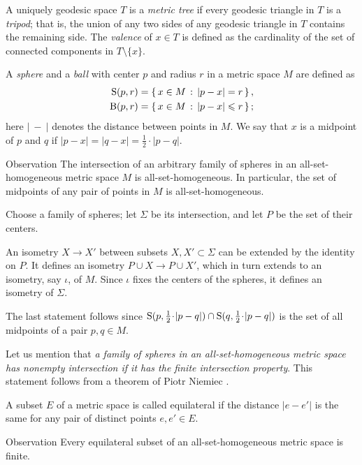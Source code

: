 \documentclass[leqno,a4paper,10pt]{article}
\begin{document}
A uniquely geodesic space $T$ is a \emph{metric tree} if every geodesic triangle in $T$ is a \emph{tripod};
that is, the union of any two sides of any geodesic triangle in $T$ contains the remaining side.
The \emph{valence} of $x\in T$ is defined as the cardinality of the set of connected components in $T\setminus \{x\}$.


A \emph{sphere} and a \emph{ball} with center $p$ and radius $r$ in a metric space $M$ are defined as
\begin{align*}
\mathrm{S}(p,r)&=\left\{\,{x\in M}\,:\,{|p-x|=r}\,\right\},
\\
\mathrm{B}(p,r)&=\left\{\,{x\in M}\,:\,{|p-x|\leqslant r}\,\right\};
\end{align*}
here $|\ -\ |$ denotes the distance between points in $M$.
We say that $x$ is a midpoint of $p$ and $q$ if $|p-x|=|q-x|=\tfrac12\cdot|p-q|$.

\begin{thm}{Observation}\label{obs:spheres}
The intersection of an arbitrary family of spheres in an all-set-homogeneous metric space $M$ is all-set-homogeneous.
In particular, the set of midpoints of any pair of points in $M$ is all-set-homogeneous.
\end{thm}

Choose a family of spheres;
let $\Sigma$ be its intersection, and let $P$ be the set of their centers.

An isometry $X \to X'$ between subsets $X,X'\subset \Sigma$ can be extended by the identity on $P$.
It defines an isometry $P\cup X\to P\cup X'$,
which in turn extends to an isometry, say $\iota$, of $M$.
Since $\iota$ fixes the centers of the spheres, it defines an isometry of $\Sigma$.

The last statement follows since $\S(p,\tfrac12\cdot|p-q|)\cap \S(q,\tfrac12\cdot|p-q|)$ is the set of all midpoints of a pair $p,q\in M$.
\qeds

Let us mention that \emph{a family of spheres in an all-set-homogeneous metric space has nonempty intersection if it has the finite intersection property}.
This statement follows from a theorem of Piotr Niemiec \cite[3.9]{niemiec2023}.

A subset $E$ of a metric space is called equilateral if the distance $|e-e'|$ is the same for any pair of distinct points $e,e'\in E$.

\begin{thm}{Observation}\label{obs:equilateral}
Every equilateral subset of an all-set-homogeneous metric space is finite.
\end{thm}
\end{document}
